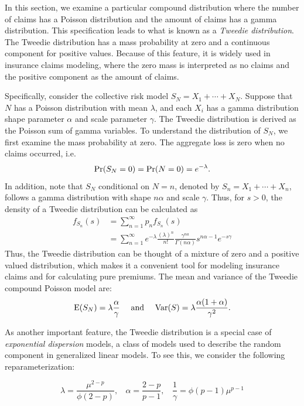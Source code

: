 \documentclass[]{book}
\theoremstyle{definition}
\theoremstyle{definition}
\theoremstyle{definition}
\theoremstyle{remark}
\begin{document}
In this section, we examine a particular compound distribution where the
number of claims has a Poisson distribution and the amount of claims has
a gamma distribution. This specification leads to what is known as a
\emph{Tweedie distribution}. The Tweedie distribution has a mass
probability at zero and a continuous component for positive values.
Because of this feature, it is widely used in insurance claims modeling,
where the zero mass is interpreted as no claims and the positive
component as the amount of claims.

Specifically, consider the collective risk model \(S_N=X_1+\cdots+X_N\).
Suppose that \(N\) has a Poisson distribution with mean \(\lambda\), and
each \(X_i\) has a gamma distribution shape parameter \(\alpha\) and
scale parameter \(\gamma\). The Tweedie distribution is derived as the
Poisson sum of gamma variables. To understand the distribution of
\(S_N\), we first examine the mass probability at zero. The aggregate
loss is zero when no claims occurred, i.e.
\[{\rm Pr}(S_N=0)= {\rm Pr}(N=0)=e^{-\lambda}.\] In addition, note that
\(S_N\) conditional on \(N=n\), denoted by \(S_n=X_1+\cdots+X_n\),
follows a gamma distribution with shape \(n\alpha\) and scale
\(\gamma\). Thus, for \(s>0\), the density of a Tweedie distribution can
be calculated as \[\begin{aligned}
f_{S_n}(s)&=\sum_{n=1}^{\infty} p_n f_{S_n}(s)\\
&=\sum_{n=1}^{\infty}e^{-\lambda}\frac{(\lambda)^n}{n!}\frac{\gamma^{na}}{\Gamma(n\alpha)}s^{n\alpha-1}e^{-s\gamma}
\end{aligned}\] Thus, the Tweedie distribution can be thought of a
mixture of zero and a positive valued distribution, which makes it a
convenient tool for modeling insurance claims and for calculating pure
premiums. The mean and variance of the Tweedie compound Poisson model
are:
\[{\rm E} (S_N)=\lambda\frac{\alpha}{\gamma}~~~~{\rm and}~~~~{\rm Var} (S)=\lambda\frac{\alpha(1+\alpha)}{\gamma^2}.\]

As another important feature, the Tweedie distribution is a special case
of \emph{exponential dispersion} models, a class of models used to
describe the random component in generalized linear models. To see this,
we consider the following reparameterization:

\begin{equation*}
\lambda=\frac{\mu^{2-p}}{\phi(2-p)},~~~~\alpha=\frac{2-p}{p-1},~~~~\frac{1}{\gamma}=\phi(p-1)\mu^{p-1}
\end{equation*}
\end{document}
